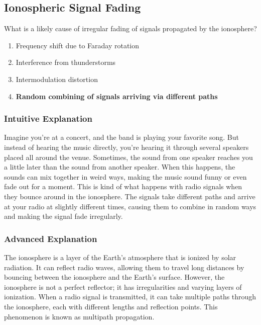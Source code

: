 \subsection{Ionospheric Signal Fading}
\label{T3A08}

\begin{tcolorbox}[colback=gray!10!white,colframe=black!75!black,title=T3A08]
What is a likely cause of irregular fading of signals propagated by the ionosphere?
\begin{enumerate}[label=\Alph*)]
    \item Frequency shift due to Faraday rotation
    \item Interference from thunderstorms
    \item Intermodulation distortion
    \item \textbf{Random combining of signals arriving via different paths}
\end{enumerate}
\end{tcolorbox}

\subsubsection*{Intuitive Explanation}
Imagine you're at a concert, and the band is playing your favorite song. But instead of hearing the music directly, you're hearing it through several speakers placed all around the venue. Sometimes, the sound from one speaker reaches you a little later than the sound from another speaker. When this happens, the sounds can mix together in weird ways, making the music sound funny or even fade out for a moment. This is kind of what happens with radio signals when they bounce around in the ionosphere. The signals take different paths and arrive at your radio at slightly different times, causing them to combine in random ways and making the signal fade irregularly.

\subsubsection*{Advanced Explanation}
The ionosphere is a layer of the Earth's atmosphere that is ionized by solar radiation. It can reflect radio waves, allowing them to travel long distances by bouncing between the ionosphere and the Earth's surface. However, the ionosphere is not a perfect reflector; it has irregularities and varying layers of ionization. When a radio signal is transmitted, it can take multiple paths through the ionosphere, each with different lengths and reflection points. This phenomenon is known as multipath propagation.

